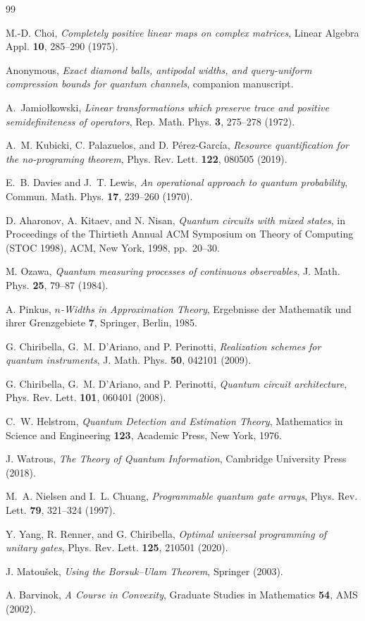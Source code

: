\documentclass[11pt,a4paper]{article}
\begin{document}
\begin{thebibliography}{99}

M.-D. Choi, \emph{Completely positive linear maps on complex matrices}, Linear Algebra Appl. \textbf{10}, 285--290 (1975).

Anonymous, \emph{Exact diamond balls, antipodal widths, and query-uniform compression bounds for quantum channels}, companion manuscript.

A.~Jamio{\l}kowski, \emph{Linear transformations which preserve trace and positive semidefiniteness of operators}, Rep. Math. Phys. \textbf{3}, 275--278 (1972).

A.~M. Kubicki, C. Palazuelos, and D. P\'erez-Garc\'ia, \emph{Resource quantification for the no-programing theorem}, Phys. Rev. Lett. \textbf{122}, 080505 (2019).

E.~B. Davies and J.~T. Lewis, \emph{An operational approach to quantum probability}, Commun. Math. Phys. \textbf{17}, 239--260 (1970).

D. Aharonov, A. Kitaev, and N. Nisan, \emph{Quantum circuits with mixed states}, in Proceedings of the Thirtieth Annual ACM Symposium on Theory of Computing (STOC 1998), ACM, New York, 1998, pp.~20--30.

M. Ozawa, \emph{Quantum measuring processes of continuous observables}, J. Math. Phys. \textbf{25}, 79--87 (1984).

A. Pinkus, \emph{$n$-Widths in Approximation Theory}, Ergebnisse der Mathematik und ihrer Grenzgebiete \textbf{7}, Springer, Berlin, 1985.

G. Chiribella, G.~M. D'Ariano, and P. Perinotti, \emph{Realization schemes for quantum instruments}, J. Math. Phys. \textbf{50}, 042101 (2009).

G. Chiribella, G.~M. D'Ariano, and P. Perinotti, \emph{Quantum circuit architecture}, Phys. Rev. Lett. \textbf{101}, 060401 (2008).

C.~W. Helstrom, \emph{Quantum Detection and Estimation Theory}, Mathematics in Science and Engineering \textbf{123}, Academic Press, New York, 1976.

J. Watrous, \emph{The Theory of Quantum Information}, Cambridge University Press (2018).

M.~A. Nielsen and I.~L. Chuang, \emph{Programmable quantum gate arrays}, Phys. Rev. Lett. \textbf{79}, 321--324 (1997).

Y. Yang, R. Renner, and G. Chiribella, \emph{Optimal universal programming of unitary gates}, Phys. Rev. Lett. \textbf{125}, 210501 (2020).

J. Matou{\v{s}}ek, \emph{Using the Borsuk--Ulam Theorem}, Springer (2003).

A. Barvinok, \emph{A Course in Convexity}, Graduate Studies in Mathematics \textbf{54}, AMS (2002).

\end{thebibliography}
\end{document}
